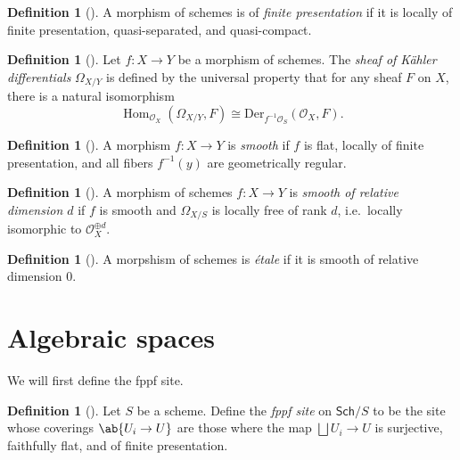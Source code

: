 \documentclass{amsart}
\theoremstyle{definition}
\newtheorem{defn}[thm]{Definition}
\theoremstyle{remark}
\theoremstyle{plain}
\theoremstyle{definition}
\theoremstyle{remark}
\newcommand{\mc}[1]{\mathcal{#1}}
\newcommand{\mr}[1]{\mathrm{#1}}
\newcommand{\ms}[1]{\mathsf{#1}}
\newcommand{\1}{\mathbf{1}}
\newcommand{\2}{\mathbf{2}}
\newcommand{\3}{\mathbf{3}}
\newcommand{\Sch}{\ms{Sch}}
\DeclareMathOperator{\Hom}{Hom}
\begin{document}
\begin{defn}[{\cite[\href{https://stacks.math.columbia.edu/tag/01TP}{Tag 01TP}]{stacks}}]
    A morphism of schemes is of \textit{finite presentation} if it is locally of finite presentation, quasi-separated, and quasi-compact.
\end{defn}

\begin{defn}[{\cite[\href{https://stacks.math.columbia.edu/tag/01UR}{Tag 01UR}]{stacks}}]
    Let $f \colon X \to Y$ be a morphism of schemes. The \textit{sheaf of K\"ahler differentials} $\Omega_{X/Y}$ is defined by the universal property that for any sheaf $F$ on $X$, there is a natural isomorphism
    \[ \Hom_{\mc{O}_X}(\Omega_{X/Y},F) \cong \mr{Der}_{f^{-1}\mc{O}_S}(\mc{O}_X, F). \]
\end{defn}


\begin{defn}[{\cite[\href{https://stacks.math.columbia.edu/tag/00TC}{Tag 00TC}, \href{https://stacks.math.columbia.edu/tag/07EL}{Tag 07EL}, \href{https://stacks.math.columbia.edu/tag/07VH}{Tag 07VH}, \href{https://stacks.math.columbia.edu/tag/01V8}{Tag 01V8}]{stacks}}]
    A morphism $f \colon X \to Y$ is \textit{smooth} if $f$ is flat, locally of finite presentation, and all fibers $f^{-1}(y)$ are geometrically regular.
\end{defn}

\begin{defn}[{\cite[\href{https://stacks.math.columbia.edu/tag/02G2}{Tag 02G2}]{stacks}}]
    A morphism of schemes $f \colon X \to Y$ is \textit{smooth of relative dimension $d$} if $f$ is smooth and $\Omega_{X/S}$ is locally free of rank $d$, i.e.\ locally isomorphic to $\mc{O}_X^{\oplus d}$.
\end{defn}

\begin{defn}[{\cite[\href{https://stacks.math.columbia.edu/tag/02GK}{Tag 02GK}]{stacks}}]
    A morpshism of schemes is \textit{\'etale} if it is smooth of relative dimension $0$.
\end{defn}

\section{Algebraic spaces}

We will first define the fppf site.

\begin{defn}[{\cite[Example 1.2.2 (4)]{fganotes}}]
    Let $S$ be a scheme. Define the \textit{fppf site} on $\Sch/S$ to be the site whose coverings $\ab\{U_i \to U\}$ are those where the map $\bigsqcup U_i \to U$ is surjective, faithfully flat, and of finite presentation.
\end{defn}
\end{document}
